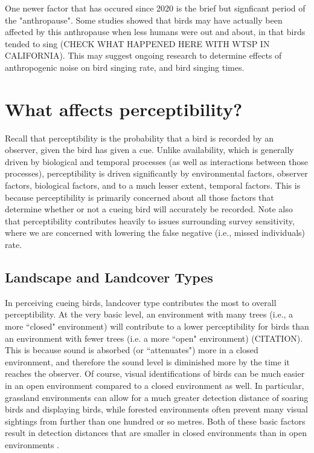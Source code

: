 \par One newer factor that has occured since 2020 is the brief but signficant period of the "anthropause".
Some studies showed that birds may have actually been affected by this anthropause when less humans were out and about, in that birds tended to sing (CHECK WHAT HAPPENED HERE WITH WTSP IN CALIFORNIA).
This may suggest ongoing research to determine effects of anthropogenic noise on bird singing rate, and bird singing times.

\section{What affects perceptibility?}

\par Recall that perceptibility is the probability that a bird is recorded by an observer, given the bird has given a cue.
Unlike availability, which is generally driven by biological and temporal processes (as well as interactions between those processes), perceptibility is driven significantly by environmental factors, observer factors, biological factors, and to a much lesser extent, temporal factors.
This is because perceptibility is primarily concerned about all those factors that determine whether or not a cueing bird will accurately be recorded.
Note also that perceptibility contributes heavily to issues surrounding survey sensitivity, where we are concerned with lowering the false negative (i.e., missed individuals) rate.

\subsection{Landscape and Landcover Types}

\par In perceiving cueing birds, landcover type contributes the most to overall perceptibility.
At the very basic level, an environment with many trees (i.e., a more ``closed" environment) will contribute to a lower perceptibility for birds than an environment with fewer trees (i.e. a more ``open" environment) (CITATION).
This is because sound is absorbed (or ``attenuates") more in a closed environment, and therefore the sound level is diminished more by the time it reaches the observer.
Of course, visual identifications of birds can be much easier in an open environment compared to a closed environment as well.
In particular, grassland environments can allow for a much greater detection distance of soaring birds and displaying birds, while forested environments often prevent many visual sightings from further than one hundred or so metres.
Both of these basic factors result in detection distances that are smaller in closed environments than in open environments \citep{edwards_point_2023, solymos_calibrating_2013, yip_sound_2017}.

